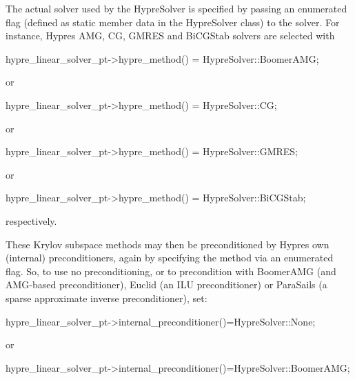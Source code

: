The actual solver used by the {\ttfamily Hypre\+Solver} is specified by passing an enumerated flag (defined as static member data in the {\ttfamily Hypre\+Solver} class) to the solver. For instance, {\ttfamily Hypre\textquotesingle{}s} A\+MG, CG, G\+M\+R\+ES and Bi\+C\+G\+Stab solvers are selected with

 
\begin{DoxyCodeInclude}
     hypre\_linear\_solver\_pt->hypre\_method() = HypreSolver::BoomerAMG;

\end{DoxyCodeInclude}


or


\begin{DoxyCodeInclude}
     hypre\_linear\_solver\_pt->hypre\_method() = HypreSolver::CG;

\end{DoxyCodeInclude}


or


\begin{DoxyCodeInclude}
     hypre\_linear\_solver\_pt->hypre\_method() = HypreSolver::GMRES;

\end{DoxyCodeInclude}


or


\begin{DoxyCodeInclude}
     hypre\_linear\_solver\_pt->hypre\_method() = HypreSolver::BiCGStab;

\end{DoxyCodeInclude}


respectively.

These Krylov subspace methods may then be preconditioned by {\ttfamily Hypre\textquotesingle{}s} own (internal) preconditioners, again by specifying the method via an enumerated flag. So, to use no preconditioning, or to precondition with {\ttfamily Boomer\+A\+MG} (and A\+M\+G-\/based preconditioner), {\ttfamily Euclid} (an I\+LU preconditioner) or {\ttfamily Para\+Sails} (a sparse approximate inverse preconditioner), set\+:


\begin{DoxyCodeInclude}
       hypre\_linear\_solver\_pt->internal\_preconditioner()=HypreSolver::None;

\end{DoxyCodeInclude}


or


\begin{DoxyCodeInclude}
       hypre\_linear\_solver\_pt->internal\_preconditioner()=HypreSolver::BoomerAMG;

\end{DoxyCodeInclude}


